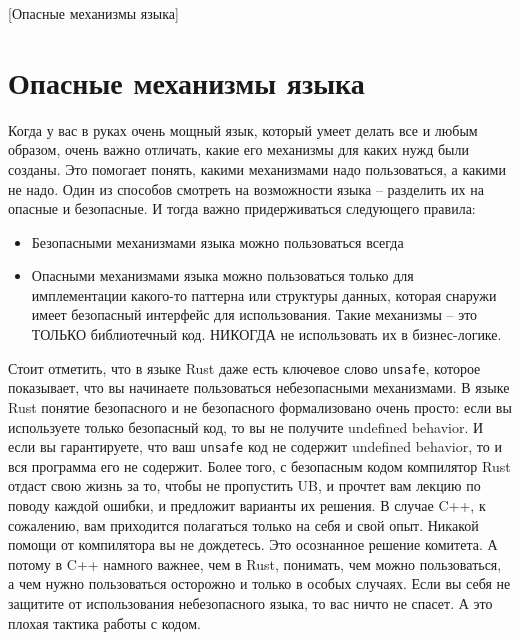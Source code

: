 [Опасные механизмы языка]


\section{Опасные механизмы языка}
\label{section::Dangerous}

Когда у вас в руках очень мощный язык, который умеет делать все и любым образом, очень важно отличать, какие его механизмы для каких нужд были созданы.
Это помогает понять, какими механизмами надо пользоваться, а какими не надо.
Один из способов смотреть на возможности языка -- разделить их на опасные и безопасные.
И тогда важно придерживаться следующего правила:
\begin{itemize}
\item Безопасными механизмами языка можно пользоваться всегда

\item Опасными механизмами языка можно пользоваться только для имплементации какого-то паттерна или структуры данных, которая снаружи имеет безопасный интерфейс для использования.
Такие механизмы -- это ТОЛЬКО библиотечный код.
НИКОГДА не использовать их в бизнес-логике.
\end{itemize}

Стоит отметить, что в языке Rust даже есть ключевое слово \verb"unsafe", которое показывает, что вы начинаете пользоваться небезопасными механизмами.
В языке Rust понятие безопасного и не безопасного формализовано очень просто: если вы используете только безопасный код, то вы не получите undefined behavior.
И если вы гарантируете, что ваш \verb"unsafe" код не содержит undefined behavior, то и вся программа его не содержит.
Более того, с безопасным кодом компилятор Rust отдаст свою жизнь за то, чтобы не пропустить UB, и прочтет вам лекцию по поводу каждой ошибки, и предложит варианты их решения.
В случае C++, к сожалению, вам приходится полагаться только на себя и свой опыт.
Никакой помощи от компилятора вы не дождетесь.
Это осознанное решение комитета.
А потому в C++ намного важнее, чем в Rust, понимать, чем можно пользоваться, а чем нужно пользоваться осторожно и только в особых случаях.
Если вы себя не защитите от использования небезопасного языка, то вас ничто не спасет.
А это плохая тактика работы с кодом.

